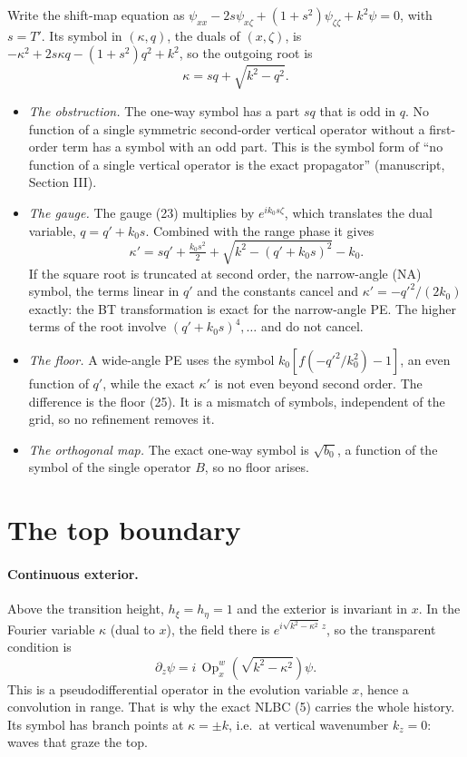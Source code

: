 \documentclass[11pt]{article}
\newcommand{\pd}{\partial}
\newcommand{\Op}{\operatorname{Op}^w}
\begin{document}
Write the shift-map equation as
$\psi_{xx}-2s\psi_{x\zeta}+(1+s^2)\psi_{\zeta\zeta}+k^2\psi=0$, with $s=T'$. Its
symbol in $(\kappa,q)$, the duals of $(x,\zeta)$, is
$-\kappa^2+2s\kappa q-(1+s^2)q^2+k^2$, so the outgoing root is
\begin{equation}\label{eq:shift}
\kappa=sq+\sqrt{k^2-q^2}.
\end{equation}
\begin{itemize}
\item \emph{The obstruction.} The one-way symbol has a part $sq$ that is odd
  in $q$. No function of a single symmetric second-order vertical operator
  without a first-order term has a symbol with an odd part. This is the symbol
  form of ``no function of a single vertical operator is the exact propagator''
  (manuscript, Section III).
\item \emph{The gauge.} The gauge (23) multiplies by $e^{ik_0s\zeta}$, which
  translates the dual variable, $q=q'+k_0s$. Combined with the range phase it
  gives
  \[
  \kappa'=sq'+\tfrac{k_0s^2}2+\sqrt{k^2-(q'+k_0s)^2}-k_0 .
  \]
  If the square root is truncated at second order, the narrow-angle (NA)
  symbol, the terms linear in $q'$ and the constants cancel and
  $\kappa'=-q'^2/(2k_0)$ exactly: the BT transformation is exact for the
  narrow-angle PE. The higher terms of the root involve $(q'+k_0s)^4,\dots$ and
  do not cancel.
\item \emph{The floor.} A wide-angle PE uses the symbol $k_0[f(-q'^2/k_0^2)-1]$,
  an even function of $q'$, while the exact $\kappa'$ is not even beyond
  second order. The difference is the floor (25). It is a mismatch of symbols,
  independent of the grid, so no refinement removes it.
\item \emph{The orthogonal map.} The exact one-way symbol is $\sqrt{b_0}$, a
  function of the symbol of the single operator $B$, so no floor arises.
\end{itemize}

\section{The top boundary}

\paragraph{Continuous exterior.} Above the transition height, $h_\xi=h_\eta=1$
and the exterior is invariant in $x$. In the Fourier variable $\kappa$ (dual to
$x$), the field there is $e^{i\sqrt{k^2-\kappa^2}\,z}$, so the transparent
condition is
\[
\pd_z\psi=i\,\Op_x\!\left(\sqrt{k^2-\kappa^2}\right)\psi .
\]
This is a pseudodifferential operator in the evolution variable $x$, hence a
convolution in range. That is why the exact NLBC (5) carries the whole history.
Its symbol has branch points at $\kappa=\pm k$, i.e.\ at vertical wavenumber
$k_z=0$: waves that graze the top.
\end{document}
